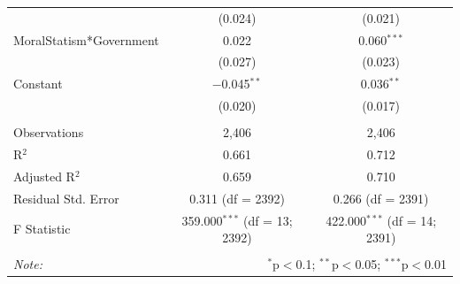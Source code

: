 \documentclass[12pt,]{article}
\begin{document}
\begin{table}[!htbp]
\begin{tabular}{@{\extracolsep{5pt}}lcc}
  & (0.024) & (0.021) \\ 
  MoralStatism*Government & 0.022 & 0.060$^{***}$ \\ 
  & (0.027) & (0.023) \\ 
  Constant & $-$0.045$^{**}$ & 0.036$^{**}$ \\ 
  & (0.020) & (0.017) \\ 
 \hline \\[-1.8ex] 
Observations & 2,406 & 2,406 \\ 
R$^{2}$ & 0.661 & 0.712 \\ 
Adjusted R$^{2}$ & 0.659 & 0.710 \\ 
Residual Std. Error & 0.311 (df = 2392) & 0.266 (df = 2391) \\ 
F Statistic & 359.000$^{***}$ (df = 13; 2392) & 422.000$^{***}$ (df = 14; 2391) \\ 
\hline 
\hline \\[-1.8ex] 
\textit{Note:}  & \multicolumn{2}{r}{$^{*}$p$<$0.1; $^{**}$p$<$0.05; $^{***}$p$<$0.01} \\ 
\end{tabular} 
\end{table}
\end{document}
